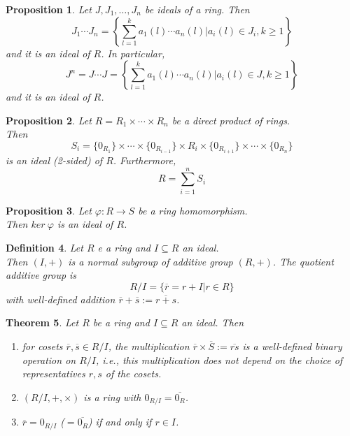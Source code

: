 \documentclass[a4paper,8pt]{article}
\newcommand{\hlt}[1]{\textit{{\color{blue}#1}}}
\theoremstyle{theorem}
\newtheorem{theorem}{Theorem}[subsection]
\newtheorem{proposition}[theorem]{Proposition}
\newtheorem{definition}[theorem]{Definition}
\begin{document}
\begin{proposition}
Let $J, J_1, \ldots, J_n$ be ideals of a ring. Then
\begin{equation}
J_1 \cdots J_n = \left\{ \sum_{l=1}^{k} a_1(l) \cdots a_n(l) | a_i(l) \in J_i, k \geq 1 \right\} \nonumber
\end{equation}
and it is an ideal of $R$. In particular, 
\begin{equation}
J^n = J \cdots J = \left\{ \sum_{l=1}^{k} a_1(l) \cdots a_n(l) | a_i(l) \in J, k \geq 1 \right\} \nonumber
\end{equation}
and it is an ideal of $R$.\\
\end{proposition}


\begin{proposition}
Let $R = R_1 \times \cdots \times R_n$ be a direct product of rings.\\
Then 
\begin{equation}
S_i = \{0_{R_1}\} \times \cdots \times \{0_{R_{i-1}}\} \times R_i \times \{0_{R_{i+1}}\} \times \cdots \times \{0_{R_n}\} \nonumber
\end{equation}
is an ideal (2-sided) of $R$. Furthermore,
\begin{equation}
R = \sum_{i=1}^{n} S_i \nonumber
\end{equation}
\end{proposition}


\begin{proposition}
Let $\varphi: R \rightarrow S$ be a ring homomorphism.\\
Then $ker \ \varphi$ is an ideal of $R$.\\
\end{proposition}


\begin{definition}
Let $R$ e a ring and $I \subseteq R$ an ideal.\\
Then $(I, +)$ is a normal subgroup of additive group $(R, +)$. The \hlt{quotient additive group} is
\begin{equation}
R/I = \{\overline{r} = r + I | r \in R\} \nonumber
\end{equation}
with well-defined addition $\overline{r} + \overline{s} := \overline{r+s}$.\\
\end{definition}


\begin{theorem}
Let $R$ be a ring and $I \subseteq R$ an ideal. Then
\begin{enumerate}[label=(\roman*)]
\item for cosets $\overline{r}, \overline{s} \in R/I$, the multiplication $\overline{r} \times \overline{S} := \overline{rs}$ is a well-defined binary operation on $R/I$, i.e., this multiplication does not depend on the choice of representatives $r, s$ of the cosets.
\item $(R/I, +, \times)$ is a ring with $0_{R/I} = \overline{0_R}$.
\item $\overline{r} = 0_{R/I}$ ($=\overline{0_R}$) if and only if $r \in I$.
\end{enumerate}
\end{theorem}
\end{document}
